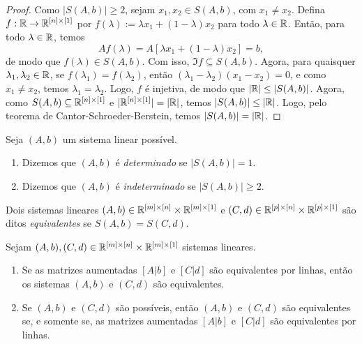 \begin{proof}
    Como $|S(A,b)| \geq 2$, sejam $x_1, x_2 \in S(A,b)$, com $x_1 \neq x_2$. Defina $f : \mathbb{R} \to \mathbb{R}^{[n]\times[1]}$ por $f(\lambda) := \lambda x_1 + (1-\lambda)x_2$ para todo $\lambda \in \mathbb{R}$. Então, para todo $\lambda \in \mathbb{R}$, temos
        \[
            A f(\lambda) = A [\lambda x_1 + (1 - \lambda)x_2] = b,
        \]
    de modo que $f(\lambda) \in S(A,b)$. Com isso, $\Im f \subseteq S(A,b)$. Agora, para quaisquer $\lambda_1, \lambda_2 \in \mathbb{R}$, se $f(\lambda_1) = f(\lambda_2)$, então $(\lambda_1 - \lambda_2)(x_1 - x_2) = 0$, e como $x_1 \neq x_2$, temos $\lambda_1 = \lambda_2$. Logo, $f$ é injetiva, de modo que $|\mathbb{R}| \leq |S(A,b)|$. Agora, como $S(A,b) \subseteq \mathbb{R}^{[n] \times [1]}$ e $|\mathbb{R}^{[n]\times[1]}| = |\mathbb{R}|$, temos $|S(A,b)| \leq |\mathbb{R}|$. Logo, pelo teorema de Cantor-Schroeder-Berstein, temos $|S(A,b)| = |\mathbb{R}|$.
\end{proof}

\begin{definition}
    Seja $(A,b)$ um sistema linear possível.
        \begin{enumerate}[leftmargin=*, align=left, label=\textbf{(\alph*)}]
            \item Dizemos que $(A,b)$ é \emph{determinado} se $|S(A,b)| = 1$.
            \item Dizemos que $(A,b)$ é \emph{indeterminado} se $|S(A,b)| \geq 2$.
        \end{enumerate}
\end{definition}

\begin{definition}
    Dois sistemas lineares $(A,b) \in \mathbb{R}^{[m] \times [n]} \times \mathbb{R}^{[m] \times [1]}$ e $(C,d) \in \mathbb{R}^{[p] \times [n]} \times \mathbb{R}^{[p] \times [1]}$ são ditos \emph{equivalentes} se $S(A,b) = S(C,d)$.
\end{definition}

\begin{proposition}
    Sejam $(A,b),(C,d) \in \mathbb{R}^{[m]\times[n]}\times\mathbb{R}^{[m]\times[1]}$ sistemas lineares.
        \begin{enumerate}[leftmargin=*, align=left, label=\textbf{(\alph*)}]
            \item Se as matrizes aumentadas $[A|b]$ e $[C|d]$ são equivalentes por linhas, então os sistemas $(A,b)$ e $(C,d)$ são equivalentes.
            \item Se $(A,b)$ e $(C,d)$ são possíveis, então $(A,b)$ e $(C,d)$ são equivalentes se, e somente se, as matrizes aumentadas $[A|b]$ e $[C|d]$ são equivalentes por linhas.
        \end{enumerate}
\end{proposition}

